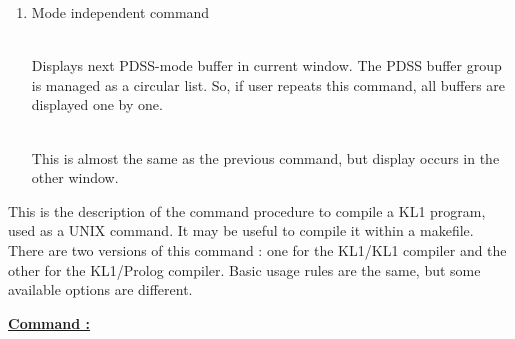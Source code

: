 \begin{enumerate}
\begin{enumerate}
\begin{itemize}
\\
Stops PDSS system, but the buffers used as Micro PIMOS windows are left
untouched.

\\
Restarts PDSS.

\end{itemize}
\end{enumerate}
\item Mode independent command
\begin{enumerate}
\begin{itemize}

\\
Displays next PDSS-mode buffer in current window. The PDSS buffer group is
managed as a circular list. So, if user repeats this command, all buffers are
displayed one by one.

\\
This is almost the same as the previous command, but display occurs in the
other window.

\end{itemize}
\end{enumerate}
\end{enumerate}

\newpage
{}

This is the description of the command procedure to compile a KL1 program,
used as a
UNIX command. It may be useful to compile it within a makefile. There are
two versions of this command : one for the KL1/KL1 compiler and the other
 for the
KL1/Prolog compiler. Basic usage rules are the same, but some available 
options are different.
\vspace{3ex}

\noindent\underline{\bf Command :}\vspace{2ex}\par
{}
\vspace{3ex}

